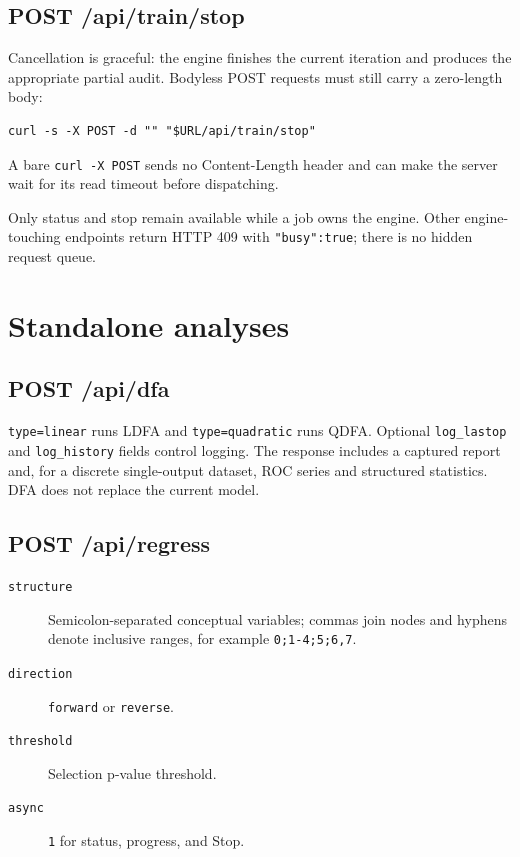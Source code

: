 \subsection{POST /api/train/stop}

Cancellation is graceful: the engine finishes the current iteration
and produces the appropriate partial audit.  Bodyless POST requests
must still carry a zero-length body:

\begin{verbatim}
curl -s -X POST -d "" "$URL/api/train/stop"
\end{verbatim}

A bare \texttt{curl -X POST} sends no Content-Length header and can
make the server wait for its read timeout before dispatching.

Only status and stop remain available while a job owns the engine.
Other engine-touching endpoints return HTTP 409 with
\texttt{"busy":true}; there is no hidden request queue.

\section{Standalone analyses}

\subsection{POST /api/dfa}

\texttt{type=linear} runs LDFA and
\texttt{type=quadratic} runs QDFA.  Optional
\texttt{log\_lastop} and \texttt{log\_history} fields control logging.
The response includes a captured report and, for a discrete
single-output dataset, ROC series and structured statistics.  DFA does
not replace the current model.

\subsection{POST /api/regress}

\begin{description}
\item[\texttt{structure}] Semicolon-separated conceptual variables;
commas join nodes and hyphens denote inclusive ranges, for example
\texttt{0;1-4;5;6,7}.
\item[\texttt{direction}] \texttt{forward} or \texttt{reverse}.
\item[\texttt{threshold}] Selection p-value threshold.
\item[\texttt{async}] \texttt{1} for status, progress, and Stop.
\end{description}

